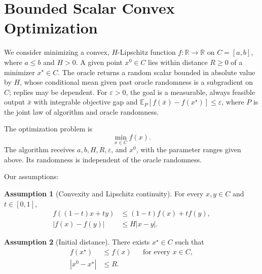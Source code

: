 \documentclass[10pt]{article}
\theoremstyle{definition}
\newtheorem{assumption}{Assumption}
\begin{document}
\section*{Bounded Scalar Convex Optimization}
We consider minimizing a convex, $H$-Lipschitz function $f:\mathbb{R}\to\mathbb{R}$ on $C=[a,b]$, where $a\leq b$ and $H>0$. A given point $x^0\in C$ lies within distance $R\geq0$ of a minimizer $x^\star\in C$. The oracle returns a random scalar bounded in absolute value by $H$, whose conditional mean given past oracle randomness is a subgradient on $C$; replies may be dependent. For $\varepsilon>0$, the goal is a measurable, always feasible output $\bar{x}$ with integrable objective gap and $\mathbb{E}_{P}[f(\bar{x})-f(x^\star)]\leq\varepsilon$, where $P$ is the joint law of algorithm and oracle randomness.

The optimization problem is
\[
\min_{x\in C} f(x).
\]
The algorithm receives $a,b,H,R,\varepsilon$, and $x^0$, with the parameter ranges given above. Its randomness is independent of the oracle randomness.

Our assumptions:
\begin{assumption}[Convexity and Lipschitz continuity]
For every $x,y\in C$ and $t\in[0,1]$,
\[
\begin{aligned}
f((1-t)x+ty)&\leq(1-t)f(x)+tf(y),\\
|f(x)-f(y)|&\leq H|x-y|.
\end{aligned}
\]
\end{assumption}

\begin{assumption}[Initial distance]
There exists $x^\star\in C$ such that
\[
\begin{aligned}
f(x^\star)&\leq f(x) &&\text{for every }x\in C,\\
|x^0-x^\star|&\leq R.
\end{aligned}
\]
\end{assumption}
\end{document}
